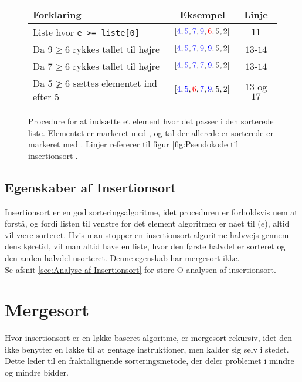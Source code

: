 	\begin{figure}[h]
		\begin{center}
			\padtable
			\begin{tabular}{l|c|c}
				Forklaring & Eksempel & Linje\\
				\hline
				Liste hvor \verb|e >= liste[0]| & $[\color{blue}4\color{black},\color{blue}5\color{black},\color{blue}7\color{black},\color{blue}9\color{black},\color{red}6\color{black},5,2]$ &$11$\\
				Da $9 \geq 6$ rykkes tallet til højre & $[\color{blue}4\color{black},\color{blue}5\color{black},\color{blue}7\color{black},\color{blue}9\color{black},\color{blue}9\color{black},5,2]$ & $13$-$14$\\
				Da $7 \geq 6$ rykkes tallet til højre & $[\color{blue}4\color{black},\color{blue}5\color{black},\color{blue}7\color{black},\color{blue}7\color{black},\color{blue}9\color{black},5,2]$ & $13$-$14$\\
				Da $5 \ngeq 6$ sættes elementet ind efter $5$ & $[\color{blue}4\color{black},\color{blue}5\color{black},\color{red}6\color{black},\color{blue}7\color{black},\color{blue}9\color{black},5,2]$ & $13$ og $17$
			\end{tabular}
		\end{center}
		\vspace{-3mm}
		\caption{Procedure for at indsætte et element hvor det passer i den sorterede liste. Elementet er markeret med , og tal der allerede er sorterede er markeret med . Linjer refererer til figur \ref{fig:Pseudokode til insertionsort}.}
		\label{fig:Indsæt element hvor det passer i listen}
	\end{figure}



\subsection{Egenskaber af Insertionsort}%
\label{sub:Egenskaber af Insertionsort}
Insertionsort er en god sorteringsalgoritme, idet proceduren er forholdsvis nem at forstå, og fordi listen til venstre for det element algoritmen er nået til ($e$), altid vil være sorteret. Hvis man stopper en insertionsort-algoritme halvvejs gennem dens køretid, vil man altid have en liste, hvor den første halvdel er sorteret og den anden halvdel usorteret. Denne egenskab har mergesort ikke.\\

Se afsnit \ref{sec:Analyse af Insertionsort} for store-O analysen af insertionsort.



\section{Mergesort}
\label{sec:Mergesort}

Hvor insertionsort er en løkke-baseret algoritme, er mergesort rekursiv, idet den ikke benytter en løkke til at gentage instruktioner, men kalder sig selv i stedet. Dette leder til en fraktallignende sorteringsmetode, der deler problemet i mindre og mindre bidder. 

